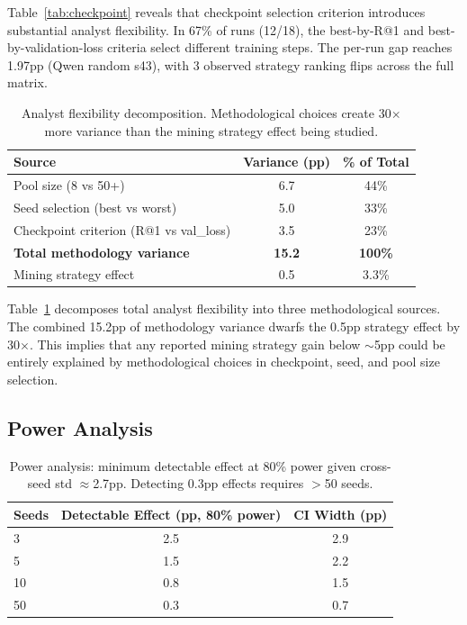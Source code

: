 \documentclass[11pt,a4paper]{article}
\begin{document}
Table~\ref{tab:checkpoint} reveals that checkpoint selection criterion introduces substantial analyst flexibility.
In 67\% of runs (12/18), the best-by-R@1 and best-by-validation-loss criteria select different training steps.
The per-run gap reaches 1.97pp (Qwen random s43), with 3 observed strategy ranking flips across the full matrix.

\begin{table}[t]
\centering
\small
\begin{tabular}{lcc}
\toprule
Source & Variance (pp) & \% of Total \\
\midrule
Pool size (8 vs 50+) & 6.7 & 44\% \\
Seed selection (best vs worst) & 5.0 & 33\% \\
Checkpoint criterion (R@1 vs val\_loss) & 3.5 & 23\% \\
\midrule
\textbf{Total methodology variance} & \textbf{15.2} & \textbf{100\%} \\
\midrule
Mining strategy effect & 0.5 & 3.3\% \\
\bottomrule
\end{tabular}
\caption{Analyst flexibility decomposition. Methodological choices create 30$\times$ more variance than the mining strategy effect being studied.}
\label{tab:flexibility}
\end{table}

Table~\ref{tab:flexibility} decomposes total analyst flexibility into three methodological sources.
The combined 15.2pp of methodology variance dwarfs the 0.5pp strategy effect by 30$\times$.
This implies that any reported mining strategy gain below $\sim$5pp could be entirely explained by methodological choices in checkpoint, seed, and pool size selection.

\subsection{Power Analysis}

\begin{table}[t]
\centering
\small
\begin{tabular}{lcc}
\toprule
Seeds & Detectable Effect (pp, 80\% power) & CI Width (pp) \\
\midrule
3 & 2.5 & 2.9 \\
5 & 1.5 & 2.2 \\
10 & 0.8 & 1.5 \\
50 & 0.3 & 0.7 \\
\bottomrule
\end{tabular}
\caption{Power analysis: minimum detectable effect at 80\% power given cross-seed std $\approx$2.7pp. Detecting 0.3pp effects requires $>$50 seeds.}
\label{tab:power}
\end{table}
\end{document}
